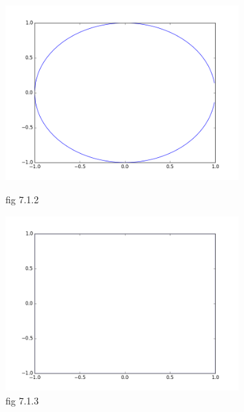 \documentclass[a4paper]{article}
\theoremstyle{definition}
\newenvironment{soln}{
    \leavevmode\color{blue}\ignorespaces
}{}
\begin{document}
\begin{enumerate}
\begin{soln}
\begin{figure}[h!]
\begin{minipage}[c]{0.3\textwidth}
	       \includegraphics[width=0.8\textwidth,height=0.8\textwidth]{hw1_7_1_2.png}  
	       \captionsetup{labelformat=empty}
	       \caption{fig 7.1.2}
	       \label{fig:7.1.2}
	       \end{minipage}
	       \hfill
               \begin{minipage}[c]{0.3\textwidth}
               \centering
	       \includegraphics[width=0.8\textwidth,height=0.8\textwidth]{hw1_7_1_3.png}  
	       \captionsetup{labelformat=empty}
	       \caption{fig 7.1.3}
	       \label{fig:7.1.3}
	       \end{minipage}
	   \end{figure}


	\end{soln}
\end{enumerate}
\end{document}
